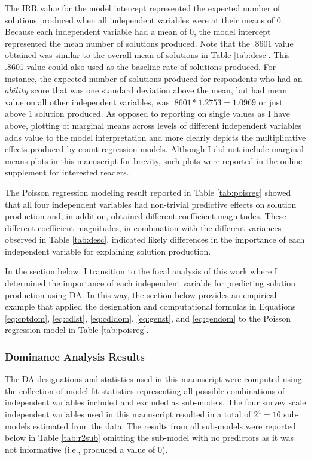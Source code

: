 \documentclass[man]{apa7}
\begin{document}
	The IRR value for the model intercept represented the expected number of solutions produced when all independent variables were at their means of 0.
	Because each independent variable had a mean of 0, the model intercept represented the mean number of solutions produced. 
	Note that the .8601 value obtained was similar to the overall mean of solutions in Table \ref{tab:desc}.
	This .8601 value could also used as the baseline rate of solutions produced.
	For instance, the expected number of solutions produced for respondents who had an $ability$ score that was one standard deviation above the mean, but had mean value on all other independent variables, was $.8601*1.2753 = 1.0969$ or just above 1 solution produced.
	As opposed to reporting on single values as I have above, plotting of marginal means across levels of different independent variables adds value to the model interpretation \parencite[see][for a similar perspective]{ronkko2022eight} and more clearly depicts the multiplicative effects produced by count regression models.
	Although I did not include marginal means plots in this manuscript for brevity, such plots were reported in the online supplement for interested readers.
	
	The Poisson regression modeling result reported in Table \ref{tab:poisreg} showed that all four independent variables had non-trivial predictive effects on solution production and, in addition, obtained different coefficient magnitudes.
	These different coefficient magnitudes, in combination with the different variances observed in Table \ref{tab:desc}, indicated likely differences in the importance of each independent variable for explaining solution production.
	
	In the section below, I transition to the focal analysis of this work where I determined the importance of each independent variable for predicting solution production using DA.
	In this way, the section below provides an empirical example that applied the designation and computational formulas in Equations \ref{eq:cptdom}, \ref{eq:cdlst}, \ref{eq:cdldom}, \ref{eq:genst}, and \ref{eq:gendom} to the Poisson regression model in Table \ref{tab:poisreg}.
	
		\subsubsection{Dominance Analysis Results}
	
	The DA designations and statistics used in this manuscript were computed using the collection of model fit statistics representing all possible combinations of independent variables included and excluded as sub-models.
	The four survey scale independent variables used in this manuscript resulted in a total of $2^4 = 16$ sub-models estimated from the data.
	The results from all sub-models were reported below in Table \ref{tab:r2sub} omitting the sub-model with no predictors as it was not informative (i.e., produced a value of 0).
	
\end{document}
